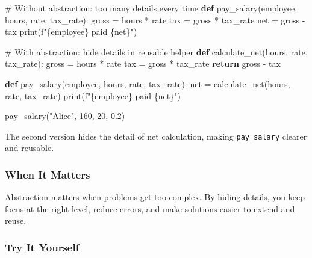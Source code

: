 \documentclass[
  letterpaper,
  DIV=11,
  numbers=noendperiod]{scrreprt}
\newenvironment{Shaded}{\begin{snugshade}}{\end{snugshade}}
\newcommand{\BuiltInTok}[1]{\textcolor[rgb]{0.00,0.23,0.31}{#1}}
\newcommand{\CommentTok}[1]{\textcolor[rgb]{0.37,0.37,0.37}{#1}}
\newcommand{\ControlFlowTok}[1]{\textcolor[rgb]{0.00,0.23,0.31}{\textbf{#1}}}
\newcommand{\DecValTok}[1]{\textcolor[rgb]{0.68,0.00,0.00}{#1}}
\newcommand{\FloatTok}[1]{\textcolor[rgb]{0.68,0.00,0.00}{#1}}
\newcommand{\KeywordTok}[1]{\textcolor[rgb]{0.00,0.23,0.31}{\textbf{#1}}}
\newcommand{\NormalTok}[1]{\textcolor[rgb]{0.00,0.23,0.31}{#1}}
\newcommand{\OperatorTok}[1]{\textcolor[rgb]{0.37,0.37,0.37}{#1}}
\newcommand{\SpecialCharTok}[1]{\textcolor[rgb]{0.37,0.37,0.37}{#1}}
\newcommand{\SpecialStringTok}[1]{\textcolor[rgb]{0.13,0.47,0.30}{#1}}
\newcommand{\StringTok}[1]{\textcolor[rgb]{0.13,0.47,0.30}{#1}}
\begin{document}
\begin{Shaded}
\begin{Highlighting}[]
\CommentTok{\# Without abstraction: too many details every time}
\KeywordTok{def}\NormalTok{ pay\_salary(employee, hours, rate, tax\_rate):}
\NormalTok{    gross }\OperatorTok{=}\NormalTok{ hours }\OperatorTok{*}\NormalTok{ rate}
\NormalTok{    tax }\OperatorTok{=}\NormalTok{ gross }\OperatorTok{*}\NormalTok{ tax\_rate}
\NormalTok{    net }\OperatorTok{=}\NormalTok{ gross }\OperatorTok{{-}}\NormalTok{ tax}
    \BuiltInTok{print}\NormalTok{(}\SpecialStringTok{f"}\SpecialCharTok{\{}\NormalTok{employee}\SpecialCharTok{\}}\SpecialStringTok{ paid }\SpecialCharTok{\{}\NormalTok{net}\SpecialCharTok{\}}\SpecialStringTok{"}\NormalTok{)}

\CommentTok{\# With abstraction: hide details in reusable helper}
\KeywordTok{def}\NormalTok{ calculate\_net(hours, rate, tax\_rate):}
\NormalTok{    gross }\OperatorTok{=}\NormalTok{ hours }\OperatorTok{*}\NormalTok{ rate}
\NormalTok{    tax }\OperatorTok{=}\NormalTok{ gross }\OperatorTok{*}\NormalTok{ tax\_rate}
    \ControlFlowTok{return}\NormalTok{ gross }\OperatorTok{{-}}\NormalTok{ tax}

\KeywordTok{def}\NormalTok{ pay\_salary(employee, hours, rate, tax\_rate):}
\NormalTok{    net }\OperatorTok{=}\NormalTok{ calculate\_net(hours, rate, tax\_rate)}
    \BuiltInTok{print}\NormalTok{(}\SpecialStringTok{f"}\SpecialCharTok{\{}\NormalTok{employee}\SpecialCharTok{\}}\SpecialStringTok{ paid }\SpecialCharTok{\{}\NormalTok{net}\SpecialCharTok{\}}\SpecialStringTok{"}\NormalTok{)}

\NormalTok{pay\_salary(}\StringTok{"Alice"}\NormalTok{, }\DecValTok{160}\NormalTok{, }\DecValTok{20}\NormalTok{, }\FloatTok{0.2}\NormalTok{)}
\end{Highlighting}
\end{Shaded}

The second version hides the detail of net calculation, making
\texttt{pay\_salary} clearer and reusable.

\subsubsection{When It Matters}\label{when-it-matters-38}

Abstraction matters when problems get too complex. By hiding details,
you keep focus at the right level, reduce errors, and make solutions
easier to extend and reuse.

\subsubsection{Try It Yourself}\label{try-it-yourself-40}
\end{document}
